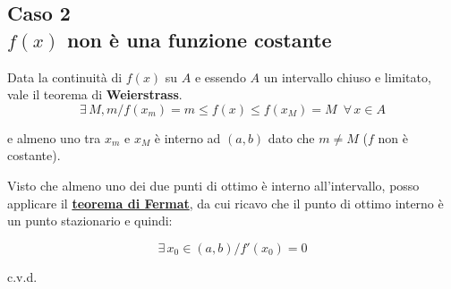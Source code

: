 \documentclass[../dimostrazioni]{subfiles}
\begin{document}
            \subsection*{Caso 2\\\(f(x)\) non è una funzione costante}

            Data la continuità di \(f(x)\) su \(A\) e essendo \(A\) un intervallo chiuso e limitato,\\ 
            vale il teorema di \textbf{Weierstrass}.
            \[ \exists \, M, m / f(x_m)=m \leqslant f(x) \leqslant f(x_M) = M \, \, \, \forall \, x \in A \]

            e almeno uno tra \(x_m\) e \(x_M\) è interno ad \( (a,b) \) dato che \( m \neq M \) (\( f \) non è costante).

            Visto che almeno uno dei due punti di ottimo è interno all'intervallo, posso applicare il \textbf{\hyperref[teoFermat]{teorema di Fermat}}, 
            da cui ricavo che il punto di ottimo interno è un punto stazionario e quindi:

            \[\exists \, x_0 \in (a,b) / f'(x_0) = 0 \]
            
            c.v.d.

    
\end{document}
